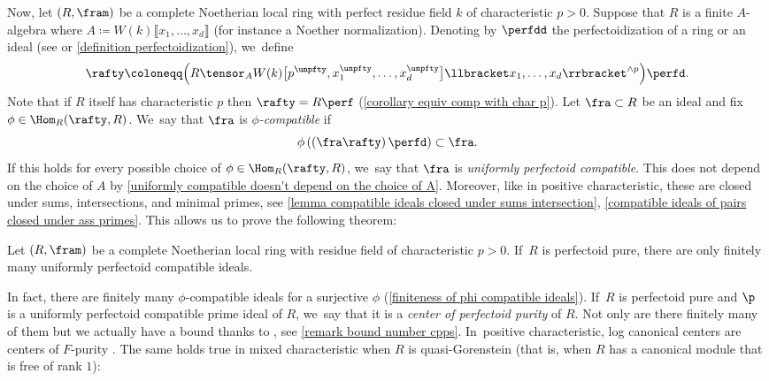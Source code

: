Now, let $(R,\fram)$ be a complete Noetherian local ring with perfect residue field $k$ of characteristic $p>0$. Suppose that $R$ is a finite $A$-algebra where
$A\coloneqq W(k)\llbracket x_1,\ldots,x_d \rrbracket $ (for instance a Noether normalization). Denoting by $\perfdd$ the perfectoidization of a ring or an ideal (see \cite[\S 10]{BhattScholzePrisms} or \autoref{definition perfectoidization}), we~define
\[
\rafty\coloneqq \Bigl(R\tensor_A W(k)\bigl[p^\unpfty,x_1^\unpfty, \ldots,x_d^\unpfty\bigr]\llbracket x_1,\ldots,x_d\rrbracket^{\wedge p}\Bigr)\perfd.
\]
Note that if $R$ itself has characteristic $p$ then $\rafty=R\perf$ (\autoref{corollary equiv comp with char p}). Let $\fra\subset R$ be an ideal and fix $\phi\in \Hom_R(\rafty,R)$. We~say that $\fra$ is \emph{$\phi$-compatible} if
\[\phi\left(\left (\fra\rafty\right)\perfd \right) \subset \fra.
\]
If this holds for every possible choice of $\phi\in \Hom_R(\rafty,R)$, we~say that $\fra$ is \emph{uniformly perfectoid compatible}. This does not depend on the choice of $A$ by \autoref{uniformly compatible doesn't depend on the choice of A}. Moreover, like in positive characteristic, these are closed under sums, intersections, and minimal primes, see \autoref{lemma compatible ideals closed under sums intersection}, \autoref{compatible ideals of pairs closed under ass primes}. This allows us to prove the following theorem:

\begin{mainthm}
Let $(R,\fram)$ be a complete Noetherian local ring with residue field of characteristic $p>0$. If~$R$ is perfectoid pure, there are only finitely many uniformly perfectoid compatible ideals.
\end{mainthm}

In fact, there are finitely many $\phi$-compatible ideals for a surjective $\phi$ (\autoref{finiteness of phi compatible ideals}). If~$R$ is perfectoid pure and $\p$ is a uniformly perfectoid compatible prime ideal of $R$, we~say that it is a \emph{center of perfectoid purity} of $R$. Not only are there finitely many of them but we actually have a bound thanks to \cite{SchwedeTuckerNumberOfFSplit}, see \autoref{remark bound number cpps}. In~positive characteristic, log canonical centers are centers of $F$-purity \cite{SchwedeCentersOfFPurity}. The same holds true in mixed characteristic when $R$ is quasi-Gorenstein (that is, when $R$ has a canonical module that is free of rank $1$):

